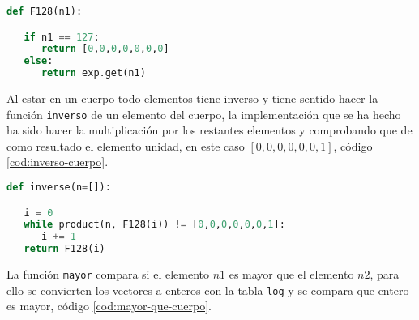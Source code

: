 \begin{lstlisting}[language=Python,caption=Convierte un entero en un elemento del cuerpo, label=cod:entero-cuerpo]
def F128(n1):

   if n1 == 127:
      return [0,0,0,0,0,0,0]
   else:
      return exp.get(n1)
\end{lstlisting}


Al estar en un cuerpo todo elementos tiene inverso y tiene sentido hacer la función \texttt{inverso} de un elemento del cuerpo, la implementación que se ha hecho ha sido hacer la multiplicación por los restantes elementos y comprobando que de como resultado el elemento unidad, en este caso $[0,0,0,0,0,0,1]$, código \ref{cod:inverso-cuerpo}.

\begin{table}[h]
	\label{tab:rel}
	\begin{center}
	\centering
	\end{center}
	\caption{Parámetros de la función \texttt{inverse}}
\end{table}

\vspace{0.25cm}
\begin{lstlisting}[language=Python,caption=Inverso de un elemento del cuerpo, label=cod:inverso-cuerpo]
def inverse(n=[]):

   i = 0
   while product(n, F128(i)) != [0,0,0,0,0,0,1]:
      i += 1
   return F128(i)
\end{lstlisting}

La función \texttt{mayor} compara si el elemento $n1$ es mayor que el elemento $n2$, para ello se convierten los vectores a enteros con la tabla \texttt{log} y se compara que entero es mayor, código \ref{cod:mayor-que-cuerpo}.

